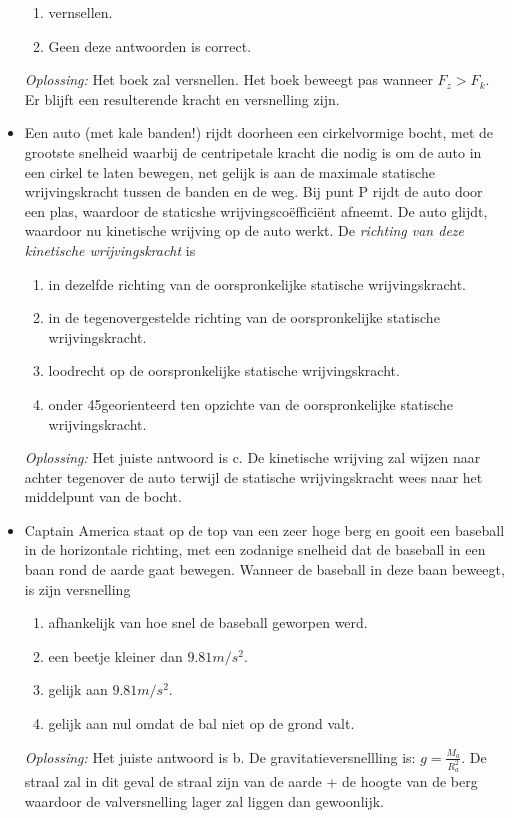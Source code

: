 \documentclass[12pt,a4paper]{article}
\begin{document}
\begin{itemize}
\begin{enumerate}[label=\alph*]
    	\item vernsellen.
    	\item Geen deze antwoorden is correct. 
    \end{enumerate}
	\textit{Oplossing:} Het boek zal versnellen. Het boek beweegt pas wanneer \(F_z > F_k\). Er blijft een resulterende kracht en versnelling zijn. 
	\newline
	\item Een auto (met kale banden!) rijdt doorheen een cirkelvormige bocht, met de grootste snelheid waarbij de centripetale kracht die nodig is om de auto in een cirkel te laten bewegen, net gelijk is aan de maximale statische wrijvingskracht tussen de banden en de weg. Bij punt P rijdt de auto door een plas, waardoor de staticshe wrijvingscoëfficiënt afneemt. De auto glijdt, waardoor nu kinetische wrijving op de auto werkt. De \textit{richting van deze kinetische wrijvingskracht} is
	\begin{enumerate}[label=\alph*]
		\item in dezelfde richting van de oorspronkelijke statische wrijvingskracht.
		\item in de tegenovergestelde richting van de oorspronkelijke statische wrijvingskracht.
		\item loodrecht op de oorspronkelijke statische wrijvingskracht.
		\item onder 45\degree georienteerd ten opzichte van de oorspronkelijke statische wrijvingskracht.
	\end{enumerate}
	\textit{Oplossing:} Het juiste antwoord is c. De kinetische wrijving zal wijzen naar achter tegenover de auto terwijl de statische wrijvingskracht wees naar het middelpunt van de bocht. 
	\newline
	\item Captain America staat op de top van een zeer hoge berg en gooit een baseball in de horizontale richting, met een zodanige snelheid dat de baseball in een baan rond de aarde gaat bewegen. Wanneer de baseball in deze baan beweegt, is zijn versnelling
	\begin{enumerate}[label=\alph*]
		\item afhankelijk van hoe snel de baseball geworpen werd.
		\item een beetje kleiner dan \(9.81 m/s^2\).
	 	\item gelijk aan \(9.81 m/s^2\).
	 	\item gelijk aan nul omdat de bal niet op de grond valt. 
	\end{enumerate}
	\textit{Oplossing:} Het juiste antwoord is b. De gravitatieversnellling is: \(g = \frac{M_a}{R_a^2}\). De straal zal in dit geval de straal zijn van de aarde + de hoogte van de berg waardoor de valversnelling lager zal liggen dan gewoonlijk. 

\end{itemize}
\end{document}
